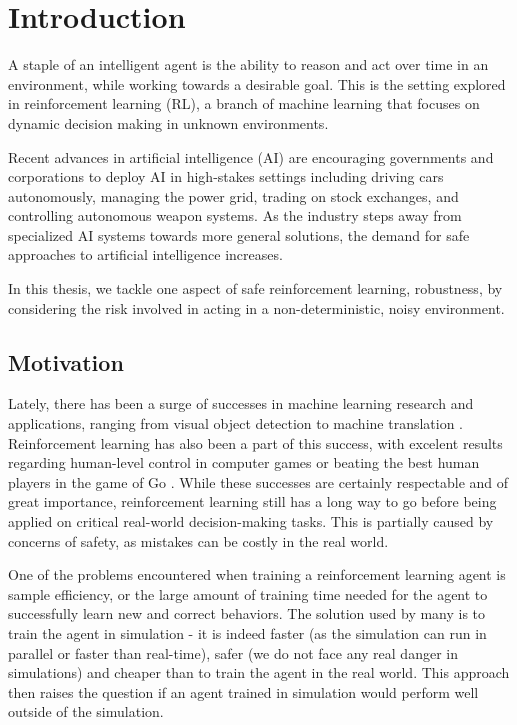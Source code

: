 \chapter{Introduction}\label{ch:intro}

A staple of an intelligent agent is the ability to reason and act over time in an environment, while working towards a desirable goal. This is the setting explored in reinforcement learning (RL), a branch of machine learning that focuses on dynamic decision making in unknown environments.

Recent advances in artificial intelligence (AI) are encouraging governments and corporations to deploy AI in high-stakes settings including driving cars autonomously, managing the power grid, trading on stock exchanges, and controlling autonomous weapon systems. As the industry steps away from specialized AI systems towards more general solutions, the demand for safe approaches to artificial intelligence increases.

In this thesis, we tackle one aspect of safe reinforcement learning, robustness, by considering the risk involved in acting in a non-deterministic, noisy environment.

\section{Motivation}\label{sec:intro:motivation}

Lately, there has been a surge of successes in machine learning research and applications, ranging from visual object detection \cite{krizhevsky2012imagenet} to machine translation \citep{bahdanau2014neural}. Reinforcement learning has also been a part of this success, with excelent results regarding human-level control in computer games \cite{mnih2015human} or beating the best human players in the game of Go \citep{silver2017mastering}. While these successes are certainly respectable and of great importance, reinforcement learning still has a long way to go before being applied on critical real-world decision-making tasks. This is partially caused by concerns of safety, as mistakes can be costly in the real world.

One of the problems encountered when training a reinforcement learning agent is sample efficiency, or the large amount of training time needed for the agent to successfully learn new and correct behaviors. The solution used by many \citep{many} is to train the agent in simulation - it is indeed faster (as the simulation can run in parallel or faster than real-time), safer (we do not face any real danger in simulations) and cheaper than to train the agent in the real world.
This approach then raises the question if an agent trained in simulation would perform well outside of the simulation.

